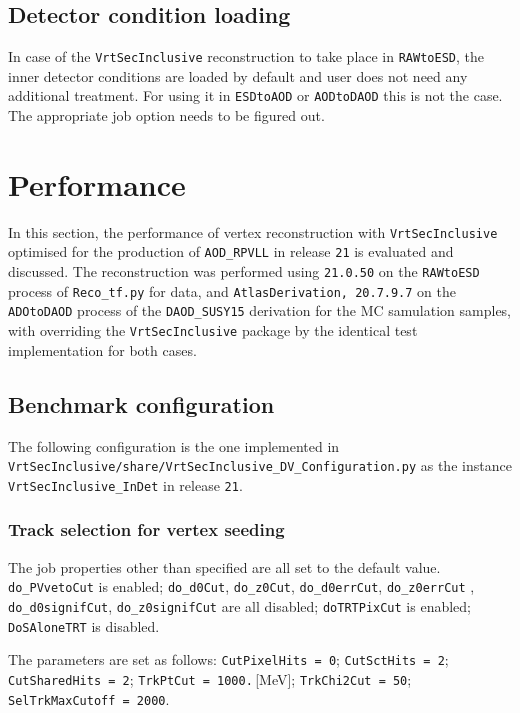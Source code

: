 \documentclass[NOTE, atlasdraft=true, texlive=2018, UKenglish]{\ATLASLATEXPATH atlasdoc}
\begin{document}
\subsection{Detector condition loading}
In case of the {\tt VrtSecInclusive} reconstruction to take place in {\tt RAWtoESD}, the inner detector conditions are loaded by default and user does not need any additional treatment. For using it in {\tt ESDtoAOD} or {\tt AODtoDAOD} this is not the case. The appropriate job option needs to be figured out.


\section{Performance}
\label{sec:result}

In this section, the performance of vertex reconstruction with {\tt VrtSecInclusive} optimised for the production of {\tt AOD\_RPVLL} in release {\tt 21} is evaluated and discussed. The reconstruction was performed using {\tt 21.0.50} on the {\tt RAWtoESD} process of {\tt Reco\_tf.py} for data, and {\tt AtlasDerivation, 20.7.9.7} on the {\tt ADOtoDAOD} process of the {\tt DAOD\_SUSY15} derivation for the MC samulation samples, with overriding the {\tt VrtSecInclusive} package by the identical test implementation for both cases.

\subsection{Benchmark configuration}
The following configuration is the one implemented in\\{\tt VrtSecInclusive/share/VrtSecInclusive\_DV\_Configuration.py} as the instance\\ {\tt VrtSecInclusive\_InDet} in release {\tt 21}.

\subsubsection{Track selection for vertex seeding}
The job properties other than specified are all set to the default value.
{\tt do\_PVvetoCut} is enabled; {\tt do\_d0Cut}, {\tt do\_z0Cut}, {\tt do\_d0errCut}, {\tt do\_z0errCut} , {\tt do\_d0signifCut}, {\tt do\_z0signifCut} are all disabled; {\tt doTRTPixCut} is enabled; {\tt DoSAloneTRT} is disabled.

The parameters are set as follows: {\tt CutPixelHits = 0}; {\tt CutSctHits = 2}; {\tt CutSharedHits = 2}; {\tt TrkPtCut = 1000.}\,[MeV]; {\tt TrkChi2Cut = 50}; {\tt SelTrkMaxCutoff = 2000}.
\end{document}
